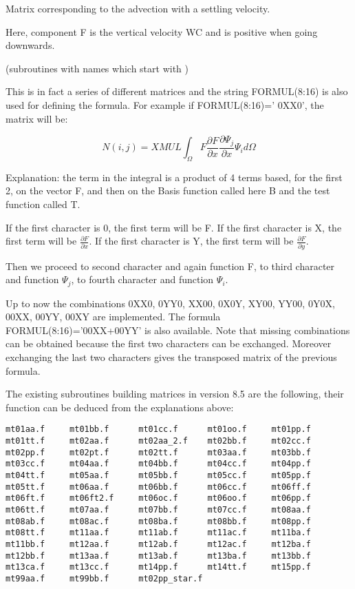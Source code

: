 Matrix corresponding to the advection with a settling velocity.

Here, component F is the vertical velocity WC and is positive when going
downwards.


(subroutines with names which start with )

This is in fact a series of different matrices and the string FORMUL(8:16) is
also used for defining the formula. For example if FORMUL(8:16)='     0XX0',
the matrix will be:

\[N(i,j)=XMUL \int _{\Omega }F\frac{\partial F}{\partial x} \frac{\partial \Psi _{j} }{\partial x} \Psi _{i} d\Omega  \]

Explanation: the term in the integral is a product of 4 terms based, for the
first 2, on the vector F, and then on the Basis function called here B and the
test function called T.

If the first character is 0, the first term will be F.
If the first character is X, the first term will be $\frac{\partial F}{\partial x} $.
If the first character is Y, the first term will be $\frac{\partial F}{\partial y} $.

Then we proceed to second character and again function F, to third character
and function $\Psi _{j} $, to fourth character and function $\Psi _{i} $.

Up to now the combinations 0XX0, 0YY0, XX00, 0X0Y, XY00, YY00, 0Y0X,
00XX, 00YY, 00XY are
implemented. The formula FORMUL(8:16)='00XX+00YY' is also available. Note that
missing combinations can be obtained because the first two characters can be
exchanged. Moreover exchanging the last two characters gives the transposed
matrix of the previous formula.

The existing subroutines building matrices in version 8.5 are the following,
their function can be deduced from the explanations above:
\begin{verbatim}
mt01aa.f     mt01bb.f      mt01cc.f      mt01oo.f     mt01pp.f
mt01tt.f     mt02aa.f      mt02aa_2.f    mt02bb.f     mt02cc.f
mt02pp.f     mt02pt.f      mt02tt.f      mt03aa.f     mt03bb.f
mt03cc.f     mt04aa.f      mt04bb.f      mt04cc.f     mt04pp.f
mt04tt.f     mt05aa.f      mt05bb.f      mt05cc.f     mt05pp.f
mt05tt.f     mt06aa.f      mt06bb.f      mt06cc.f     mt06ff.f
mt06ft.f     mt06ft2.f     mt06oc.f      mt06oo.f     mt06pp.f
mt06tt.f     mt07aa.f      mt07bb.f      mt07cc.f     mt08aa.f
mt08ab.f     mt08ac.f      mt08ba.f      mt08bb.f     mt08pp.f
mt08tt.f     mt11aa.f      mt11ab.f      mt11ac.f     mt11ba.f
mt11bb.f     mt12aa.f      mt12ab.f      mt12ac.f     mt12ba.f
mt12bb.f     mt13aa.f      mt13ab.f      mt13ba.f     mt13bb.f
mt13ca.f     mt13cc.f      mt14pp.f      mt14tt.f     mt15pp.f
mt99aa.f     mt99bb.f      mt02pp_star.f 
\end{verbatim}

